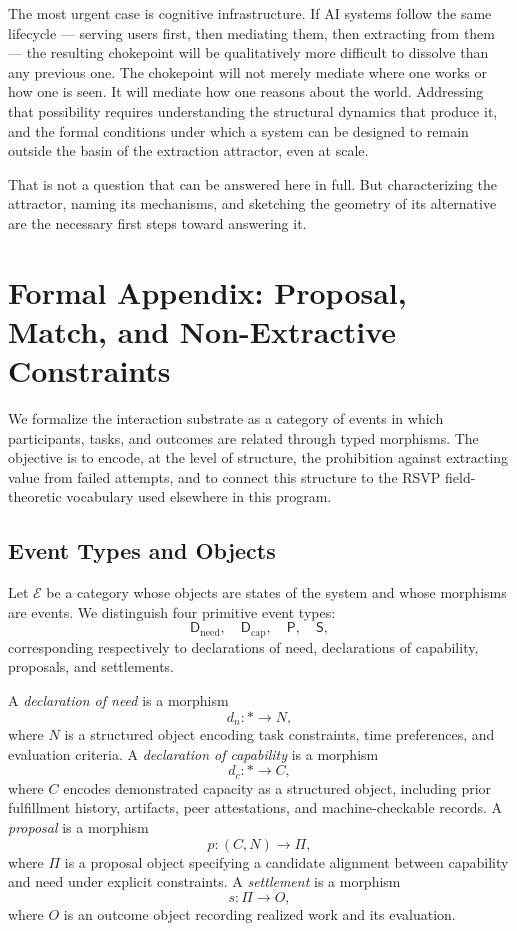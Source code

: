\documentclass[12pt, a4paper]{article}
\begin{document}
The most urgent case is cognitive infrastructure. If AI systems follow the same
lifecycle --- serving users first, then mediating them, then extracting from
them --- the resulting chokepoint will be qualitatively more difficult to
dissolve than any previous one. The chokepoint will not merely mediate where
one works or how one is seen. It will mediate how one reasons about the world.
Addressing that possibility requires understanding the structural dynamics that
produce it, and the formal conditions under which a system can be designed to
remain outside the basin of the extraction attractor, even at scale.

That is not a question that can be answered here in full. But characterizing
the attractor, naming its mechanisms, and sketching the geometry of its
alternative are the necessary first steps toward answering it.

\vspace{2em}
\appendix

\section{Formal Appendix: Proposal, Match, and Non-Extractive Constraints}

We formalize the interaction substrate as a category of events in which
participants, tasks, and outcomes are related through typed morphisms. The
objective is to encode, at the level of structure, the prohibition against
extracting value from failed attempts, and to connect this structure to the
RSVP field-theoretic vocabulary used elsewhere in this program.

\subsection{Event Types and Objects}

Let $\mathcal{E}$ be a category whose objects are states of the system and whose
morphisms are events. We distinguish four primitive event types:
\[
\mathsf{D}_{\mathrm{need}}, \quad
\mathsf{D}_{\mathrm{cap}}, \quad
\mathsf{P}, \quad
\mathsf{S},
\]
corresponding respectively to declarations of need, declarations of capability,
proposals, and settlements.

A \emph{declaration of need} is a morphism
\[
d_n : \ast \to N,
\]
where $N$ is a structured object encoding task constraints, time preferences,
and evaluation criteria. A \emph{declaration of capability} is a morphism
\[
d_c : \ast \to C,
\]
where $C$ encodes demonstrated capacity as a structured object, including
prior fulfillment history, artifacts, peer attestations, and machine-checkable
records. A \emph{proposal} is a morphism
\[
p : (C, N) \to \Pi,
\]
where $\Pi$ is a proposal object specifying a candidate alignment between
capability and need under explicit constraints. A \emph{settlement} is a
morphism
\[
s : \Pi \to O,
\]
where $O$ is an outcome object recording realized work and its evaluation.
\end{document}
